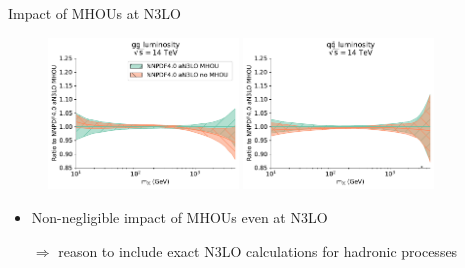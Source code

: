 \begin{frame}{Impact of MHOUs at N3LO}
  \begin{figure}[!t]
    \centering
    \includegraphics[width=0.45\textwidth]{figures/gg_plot_lumi1d.pdf}
    \includegraphics[width=0.45\textwidth]{figures/qqbar_plot_lumi1d.pdf}
  \end{figure}
  \begin{itemize}
    \item Non-negligible impact of MHOUs even at N3LO
    \item[$\Rightarrow$] reason to include exact N3LO calculations for hadronic processes
  \end{itemize}
\end{frame}


